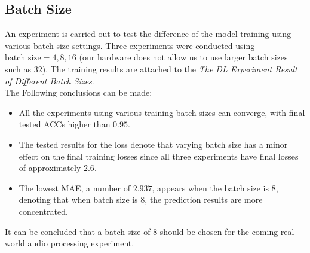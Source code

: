 \subsection*{Batch Size}
An experiment is carried out to test the difference of the model training using various batch size settings. Three experiments were conducted using \(\text{batch size} = 4,8,16\) (our hardware does not allow us to use larger batch sizes such as \(32\)). The training results are attached to the \textit{The DL Experiment Result of Different Batch Sizes}.\\
The Following conclusions can be made:
\begin{itemize}
    \item All the experiments using various training batch sizes can converge, with final tested ACCs higher than \(0.95\).
    \item The tested results for the loss denote that varying batch size has a minor effect on the final training losses since all three experiments have final losses of approximately \(2.6\).
    \item The lowest MAE, a number of \(2.937\), appears when the batch size is \(8\), denoting that when batch size is \(8\), the prediction results are more concentrated.
\end{itemize}
It can be concluded that a batch size of \(8\) should be chosen for the coming real-world audio processing experiment.

